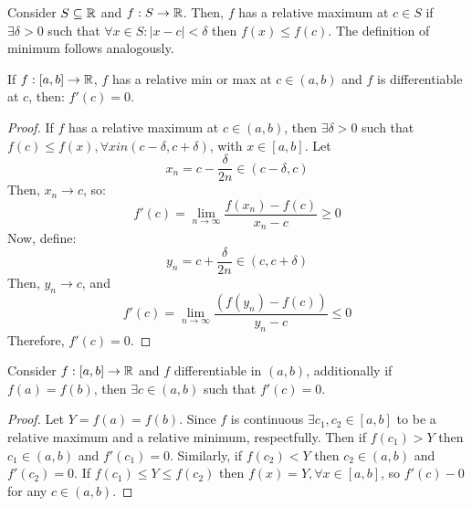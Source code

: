 \begin{definition}
    Consider $S \subseteq \mathbb{R}$ and $f: S \to \mathbb{R}$. Then, $f$ has a relative maximum at $c \in S$ if $\exists \delta > 0$ such that $\forall x \in S: |x-c| < \delta$ then $f(x) \leq f(c)$. The definition of minimum follows analogously.
\end{definition}

\begin{theorem}
    If $f:[a,b] \to \mathbb{R}$, $f$ has a relative min or max at $c \in (a,b)$ and $f$ is differentiable at $c$, then: $f'(c) = 0$.
\end{theorem}

\begin{proof}
    If $f$ has a relative maximum at $c \in (a,b)$, then $\exists \delta > 0$ such that $f(c) \leq f(x), \forall x in (c- \delta, c + \delta)$, with $x \in [a,b]$. Let 
    \begin{equation*}
        x_n = c - \frac{\delta}{2n} \in (c- \delta, c)
    \end{equation*}
    Then, $x_n \to c$, so:
    \begin{equation*}
        f'(c) = \lim \limits_{n \to \infty} \frac{f(x_n) - f(c)}{x_n - c} \geq 0
    \end{equation*}
    Now, define:
    \begin{equation*}
        y_n = c + \frac{\delta}{2n} \in (c, c+\delta)
    \end{equation*}
    Then, $y_n \to c$, and
    \begin{equation*}
        f'(c) = \lim \limits_{n \to \infty}\frac{(f(y_n) - f(c))}{y_n - c} \leq 0
    \end{equation*}
    Therefore, $f'(c) = 0$.
\end{proof}

\begin{theorem}
    Consider $f: [a,b] \to \mathbb{R}$ and $f$ differentiable in $(a,b)$, additionally if $f(a) = f(b)$, then $\exists c \in (a,b)$ such that $f'(c) = 0$.
\end{theorem}

\begin{proof}
    Let $Y = f(a) = f(b)$. Since $f$ is continuous $\exists c_1, c_2 \in [a,b]$ to be a relative maximum and a relative minimum, respectfully. Then if $f(c_1) > Y$ then $ c_1 \in (a,b)$ and $f'(c_1) = 0$. Similarly, if $f(c_2) < Y$ then $c_2 \in (a,b)$ and $f'(c_2) = 0$. If $f(c_1) \leq Y \leq f(c_2)$ then $f(x) = Y, \forall x \in [a,b]$, so $f'(c) - 0$ for any $c \in (a,b)$.
\end{proof}

